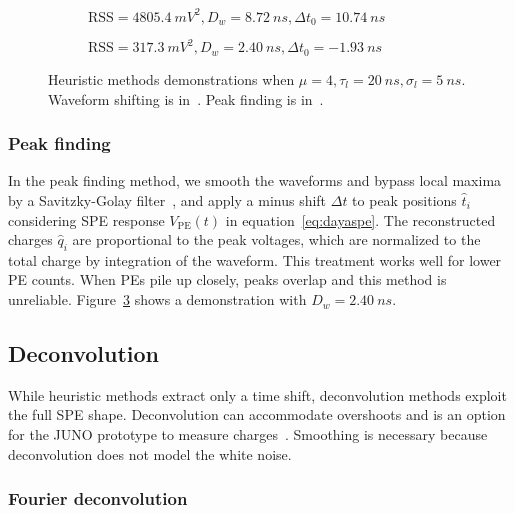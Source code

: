 \begin{figure}[H]
  \begin{subfigure}{.5\textwidth}
    \centering
    \resizebox{\textwidth}{!}{}
    \caption{\label{fig:shifting} $\mathrm{RSS}=\SI{4805.4}{mV^2},D_w=\SI{8.72}{ns},\Delta t_0=\SI{10.74}{ns}$}
  \end{subfigure}
  \begin{subfigure}{.5\textwidth}
    \centering
    \resizebox{\textwidth}{!}{}
    \caption{\label{fig:peak} $\mathrm{RSS}=\SI{317.3}{mV^2},D_w=\SI{2.40}{ns},\Delta t_0=\SI{-1.93}{ns}$}
  \end{subfigure}
  \caption{Heuristic methods demonstrations when $\mu=4, \tau_l=\SI{20}{ns}, \sigma_l=\SI{5}{ns}$. Waveform shifting is in~. Peak finding is in~.}
\end{figure}

\subsubsection{Peak finding}
\label{sec:findpeak}

In the peak finding method, we smooth the waveforms and bypass local maxima by a Savitzky-Golay filter~\cite{savitzky_smoothing_1964}, and apply a minus shift $\Delta t$ to peak positions $\hat{t}_i$ considering SPE response $V_\mathrm{PE}(t)$ in equation~\eqref{eq:dayaspe}. The reconstructed charges $\hat{q}_i$ are proportional to the peak voltages, which are normalized to the total charge by integration of the waveform. This treatment works well for lower PE counts. When PEs pile up closely, peaks overlap and this method is unreliable. Figure~\ref{fig:peak} shows a demonstration with $D_w = \SI{2.40}{ns}$. 

\subsection{Deconvolution}
\label{sec:deconv}
While heuristic methods extract only a time shift, deconvolution methods exploit the full SPE shape. Deconvolution can accommodate overshoots and is an option for the JUNO prototype to measure charges~\cite{zhang_comparison_2019}. Smoothing is necessary because deconvolution does not model the white noise. 

\subsubsection{Fourier deconvolution}

